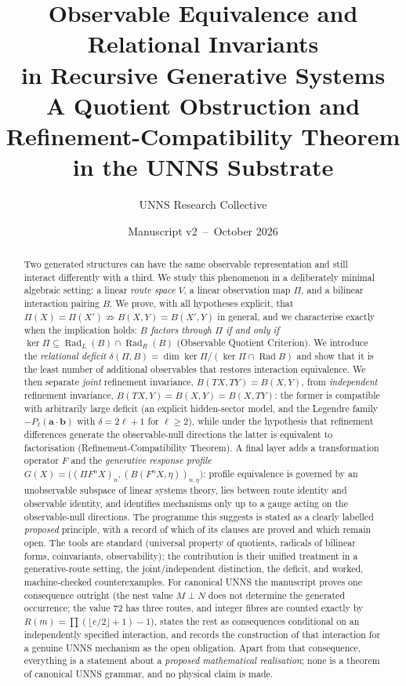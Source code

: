 \documentclass[11pt,a4paper]{article}
\title{\textbf{Observable Equivalence and Relational Invariants\\ in Recursive Generative Systems}\\[6pt]
\large A Quotient Obstruction and Refinement-Compatibility Theorem\\ in the UNNS Substrate}
\author{UNNS Research Collective}
\date{Manuscript v2 \,--\, October 2026}
\newcommand{\Rad}{\operatorname{Rad}}
\newcommand{\defic}{\delta}
\theoremstyle{plain}
\theoremstyle{definition}
\begin{document}
\maketitle

\begin{abstract}
\noindent
Two generated structures can have the same observable representation and still interact differently with a third.
We study this phenomenon in a deliberately minimal algebraic setting: a linear \emph{route space} $V$, a linear observation map $\Pi$, and a bilinear interaction pairing $B$.
We prove, with all hypotheses explicit, that
$\Pi(X)=\Pi(X')\not\Rightarrow B(X,Y)=B(X',Y)$ in general, and we characterise exactly when the implication holds:
\emph{$B$ factors through $\Pi$ if and only if $\ker\Pi\subseteq\Rad_L(B)\cap\Rad_R(B)$} (Observable Quotient Criterion).
We introduce the \emph{relational deficit} $\defic(\Pi,B)=\dim\ker\Pi/(\ker\Pi\cap\Rad B)$ and show that it is the least number of additional observables that restores interaction equivalence.
We then separate \emph{joint} refinement invariance, $B(TX,TY)=B(X,Y)$, from \emph{independent} refinement invariance, $B(TX,Y)=B(X,Y)=B(X,TY)$: the former is compatible with arbitrarily large deficit (an explicit hidden-sector model, and the Legendre family $-P_\ell(\mathbf a\cdot\mathbf b)$ with $\defic=2\ell+1$ for $\ell\ge2$), while under the hypothesis that refinement differences generate the observable-null directions the latter is equivalent to factorisation (Refinement-Compatibility Theorem).
A final layer adds a transformation operator $F$ and the \emph{generative response profile} $G(X)=\bigl((\Pi F^nX)_n,(B(F^nX,\eta))_{n,\eta}\bigr)$: profile equivalence is governed by an unobservable subspace of linear systems theory, lies between route identity and observable identity, and identifies mechanisms only up to a gauge acting on the observable-null directions.
The programme this suggests is stated as a clearly labelled \emph{proposed} principle, with a record of which of its clauses are proved and which remain open.
The tools are standard (universal property of quotients, radicals of bilinear forms, coinvariants, observability); the contribution is their unified treatment in a generative-route setting, the joint/independent distinction, the deficit, and worked, machine-checked counterexamples.
For canonical UNNS the manuscript proves one consequence outright (the nest value $M\perp N$ does not determine the generated occurrence; the value $72$ has three routes, and integer fibres are counted exactly by $R(m)=\prod(\lfloor e/2\rfloor+1)-1$), states the rest as consequences conditional on an independently specified interaction, and records the construction of that interaction for a genuine UNNS mechanism as the open obligation.
Apart from that consequence, everything is a statement about a \emph{proposed mathematical realisation}; none is a theorem of canonical UNNS grammar, and no physical claim is made.
\end{abstract}
\end{document}

